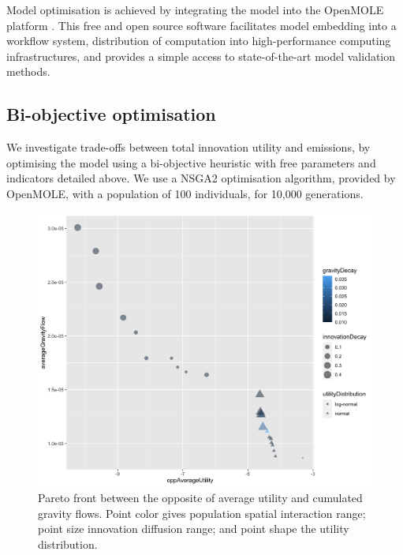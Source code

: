 \documentclass{article}
\begin{document}
Model optimisation is achieved by integrating the model into the OpenMOLE platform \cite{reuillon2013openmole}. This free and open source software facilitates model embedding into a workflow system, distribution of computation into high-performance computing infrastructures, and provides a simple access to state-of-the-art model validation methods.


\subsection{Bi-objective optimisation}

We investigate trade-offs between total innovation utility and emissions, by optimising the model using a bi-objective heuristic with free parameters and indicators detailed above. We use a NSGA2 optimisation algorithm, provided by OpenMOLE, with a population of 100 individuals, for 10,000 generations.


\begin{figure}
	\centering
	\includegraphics[width=\linewidth]{figures/pareto-oppAverageUtility-averageGravityFlow_color-gravityDecay_size-innovationDecay_shape-utilityDistribution.png}
	\caption{Pareto front between the opposite of average utility and cumulated gravity flows. Point color gives population spatial interaction range; point size innovation diffusion range; and point shape the utility distribution.\label{fig:fig1}}
\end{figure}
\end{document}
